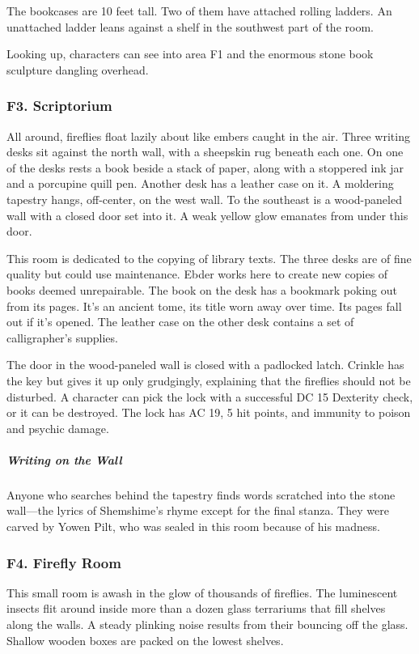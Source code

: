 \documentclass[10pt,a4paper,twoside,bg=print,twocolumn,openany,nodeprecatedcode]{dndbook}
\begin{document}
The bookcases are 10 feet tall. Two of them have attached rolling ladders. An unattached ladder leans against a shelf in the southwest part of the room.

Looking up, characters can see into area F1 and the enormous stone book sculpture dangling overhead.

\subsubsection{F3. Scriptorium}
\begin{DndReadAloud}{}
All around, fireflies float lazily about like embers caught in the air. Three writing desks sit against the north wall, with a sheepskin rug beneath each one. On one of the desks rests a book beside a stack of paper, along with a stoppered ink jar and a porcupine quill pen. Another desk has a leather case on it. A moldering tapestry hangs, off-center, on the west wall. To the southeast is a wood-paneled wall with a closed door set into it. A weak yellow glow emanates from under this door.

\end{DndReadAloud}

This room is dedicated to the copying of library texts. The three desks are of fine quality but could use maintenance. Ebder works here to create new copies of books deemed unrepairable. The book on the desk has a bookmark poking out from its pages. It's an ancient tome, its title worn away over time. Its pages fall out if it's opened. The leather case on the other desk contains a set of calligrapher's supplies.

The door in the wood-paneled wall is closed with a padlocked latch. Crinkle has the key but gives it up only grudgingly, explaining that the fireflies should not be disturbed. A character can pick the lock with a successful DC 15 Dexterity check, or it can be destroyed. The lock has AC 19, 5 hit points, and immunity to poison and psychic damage.

\subparagraph{Writing on the Wall}
Anyone who searches behind the tapestry finds words scratched into the stone wall—the lyrics of Shemshime's rhyme except for the final stanza. They were carved by Yowen Pilt, who was sealed in this room because of his madness.

\subsubsection{F4. Firefly Room}
\begin{DndReadAloud}{}
This small room is awash in the glow of thousands of fireflies. The luminescent insects flit around inside more than a dozen glass terrariums that fill shelves along the walls. A steady plinking noise results from their bouncing off the glass. Shallow wooden boxes are packed on the lowest shelves.

\end{DndReadAloud}
\end{document}
